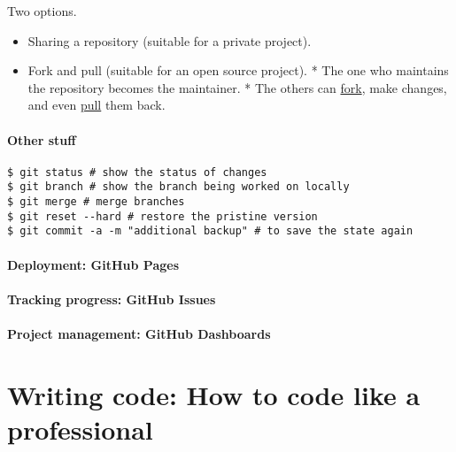 \documentclass[
]{book}
\providecommand{\tightlist}{%
  \setlength{\itemsep}{0pt}\setlength{\parskip}{0pt}}
\begin{document}
Two options.

\begin{itemize}
\tightlist
\item
  Sharing a repository (suitable for a private project).
\item
  Fork and pull (suitable for an open source project).
  \hspace{0pt} * The one who maintains the repository becomes the maintainer.
  \hspace{0pt} * The others can \href{https://help.github.com/articles/about-forks/}{fork}, make changes, and even \href{https://help.github.com/articles/about-pull-requests/}{pull} them back.
\end{itemize}

\hypertarget{other-stuff}{%
\paragraph{Other stuff}\label{other-stuff}}

\begin{verbatim}
$ git status # show the status of changes 
$ git branch # show the branch being worked on locally
$ git merge # merge branches 
$ git reset --hard # restore the pristine version
$ git commit -a -m "additional backup" # to save the state again
\end{verbatim}

\hypertarget{deployment-github-pages}{%
\paragraph{Deployment: GitHub Pages}\label{deployment-github-pages}}

\hypertarget{tracking-progress-github-issues}{%
\paragraph{Tracking progress: GitHub Issues}\label{tracking-progress-github-issues}}

\hypertarget{project-management-github-dashboards}{%
\paragraph{Project management: GitHub Dashboards}\label{project-management-github-dashboards}}

\hypertarget{writing-code-how-to-code-like-a-professional}{%
\section{Writing code: How to code like a professional}\label{writing-code-how-to-code-like-a-professional}}
\end{document}
